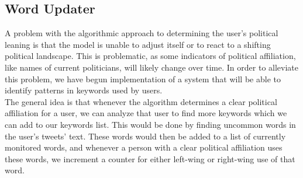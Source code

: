 \subsection{Word Updater}
A problem with the algorithmic approach to determining the user's political
leaning is that the model is unable to adjust itself or to react to a shifting
political landscape. This is problematic, as some indicators of political
affiliation, like names of current politicians, will likely change over time. In
order to alleviate this problem, we have begun implementation of a system that
will be able to identify patterns in keywords used by users.\\ 
The general idea is that whenever the algorithm determines a clear political
affiliation for a user, we can analyze that user to find more keywords which we
can add to our keywords list. This would be done by finding uncommon words in
the user's tweets' text. These words would then be added to a list of currently
monitored words, and whenever a person with a clear political affiliation uses
these words, we increment a counter for either left-wing or right-wing use of
that word. 

% 
% 
% 














